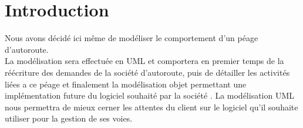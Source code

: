 
\chapter{Introduction}
\label{Cap:introduction}
Nous avons décidé ici même de modéliser le comportement d’un péage d’autoroute.\\
La modélisation sera effectuée en UML et comportera en premier temps de la réécriture des demandes de la société d’autoroute, puis de détailler les activités liées a ce péage et finalement la modélisation objet permettant une implémentation future du logiciel souhaité par la société . La modélisation UML nous permettra de mieux cerner les attentes du client sur le logiciel qu’il souhaite utiliser pour la gestion de ses voies.
